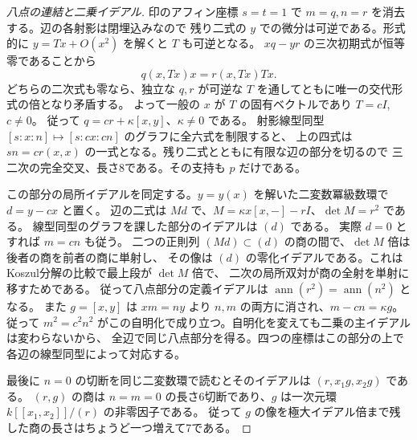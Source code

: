 \begin{proof}[八点の連結と二乗イデアル]
印のアフィン座標 $s=t=1$ で $m=q,n=r$ を消去する。辺の各射影は閉埋込みなので
残り二式の $y$ での微分は可逆である。形式的に $y=Tx+O(x^2)$ を解くと $T$ も可逆となる。
$xq-yr$ の三次初期式が恒等零であることから
\[
                     q(x,Tx)x=r(x,Tx)Tx .
\]
どちらの二次式も零なら、独立な $q,r$ が可逆な $T$ を通してともに唯一の交代形式の倍となり矛盾する。
よって一般の $x$ が $T$ の固有ベクトルであり $T=cI$, $c\ne0$。
従って $q=c r+\kappa[x,y]$、$\kappa\ne0$ である。
射影線型同型 $[s:x:n]\mapsto[s:cx:cn]$ のグラフに全六式を制限すると、
上の四式は $sn=c r(x,x)$ の一式となる。残り二式とともに有限な辺の部分を切るので
三二次の完全交叉、長さ8である。その支持も $p$ だけである。

この部分の局所イデアルを同定する。$y=y(x)$ を解いた二変数冪級数環で $d=y-cx$ と置く。
辺の二式は $Md$ で、$M=\kappa x[x,-]-r I$、$\det M=r^2$ である。
線型同型のグラフを課した部分のイデアルは $(d)$ である。
実際 $d=0$ とすれば $m=c n$ も従う。
二つの正則列 $(Md)\subset(d)$ の商の間で、$\det M$ 倍は後者の商を前者の商に単射し、
その像は $(d)$ の零化イデアルである。これはKoszul分解の比較で最上段が $\det M$ 倍で、
二次の局所双対が商の全射を単射に移すためである。
従って八点部分の定義イデアルは $\operatorname{ann}(r^2)=\operatorname{ann}(n^2)$ となる。
また $g=[x,y]$ は $xm=ny$ より $n,m$ の両方に消され、$m-cn=\kappa g$。
従って $m^2=c^2n^2$ がこの自明化で成り立つ。自明化を変えても二乗の主イデアルは変わらないから、
全辺で同じ八点部分を得る。四つの座標はこの部分の上で各辺の線型同型によって対応する。

最後に $n=0$ の切断を同じ二変数環で読むとそのイデアルは $(r,x_1g,x_2g)$ である。
$(r,g)$ の商は $n=m=0$ の長さ6切断であり、$g$ は一次元環 $k[[x_1,x_2]]/(r)$ の非零因子である。
従って $g$ の像を極大イデアル倍まで残した商の長さはちょうど一つ増えて7である。
\end{proof}
